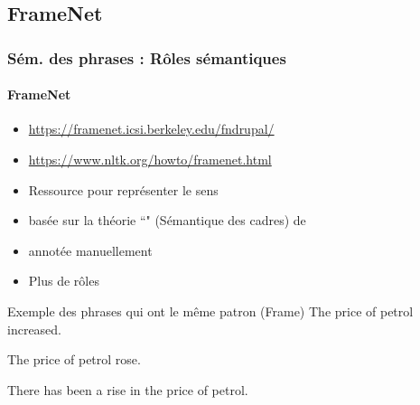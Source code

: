 \documentclass[xcolor=table]{beamer}
\begin{document}
\subsection{FrameNet}

\begin{frame}
\frametitle{Sém. des phrases : Rôles sémantiques}
\framesubtitle{FrameNet}

\begin{minipage}{.68\textwidth}
	\begin{itemize}
		\item {\scriptsize \url{https://framenet.icsi.berkeley.edu/fndrupal/}}
		\item {\scriptsize \url{https://www.nltk.org/howto/framenet.html}}
		\item Ressource pour représenter le sens 
		\item basée sur la théorie ``" (Sémantique des cadres) de 
		\item annotée manuellement
		\item Plus de rôles
	\end{itemize}
\end{minipage}
\begin{minipage}{.3\textwidth}
\end{minipage}

\begin{exampleblock}{Exemple des phrases qui ont le même patron (Frame)}
	The price of petrol increased.
	
	The price of petrol rose.
	
	There has been a rise in the price of petrol.
\end{exampleblock}

	
\end{frame}
\end{document}
